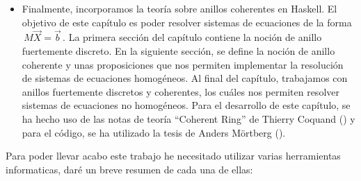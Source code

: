 \begin{itemize}
\item Finalmente, incorporamos la teoría sobre anillos coherentes en Haskell. El objetivo de este capítulo es poder resolver sistemas de ecuaciones de la forma $\,M\vec{X}=\vec{b}\,$. La primera sección del capítulo contiene la noción de anillo fuertemente discreto. En la siguiente sección, se define la noción de anillo coherente y unas proposiciones que nos permiten implementar la resolución de sistemas de ecuaciones homogéneos. Al final del capítulo, trabajamos con anillos fuertemente discretos y coherentes, los cuáles nos permiten resolver sistemas de ecuaciones no homogéneos. Para el desarrollo de este capítulo, se ha hecho uso de las notas de teoría ``Coherent Ring'' de Thierry Coquand (\cite{coherent-14}) y para el código, se ha utilizado la tesis de Anders Mörtberg (\cite{tesis}).

\end{itemize}

Para poder llevar acabo este trabajo he necesitado utilizar varias herramientas informaticas, daré un breve resumen de cada una de ellas:\\

